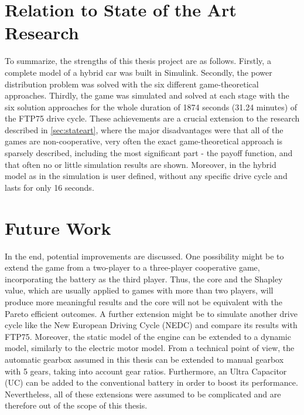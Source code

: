 \section{Relation to State of the Art Research}
To summarize, the strengths of this thesis project are as follows. Firstly, a complete model of a hybrid car was built in Simulink. Secondly, the power distribution problem was solved with the six different game-theoretical approaches. Thirdly, the game was simulated and solved at each stage with the six solution approaches for the whole duration of 1874 seconds (31.24 minutes) of the FTP75 drive cycle. These achievements are a crucial extension to the research described in \ref{sec:stateart}, where the major disadvantages were that all of the games are non-cooperative, very often the exact game-theoretical approach is sparsely described, including the most significant part - the payoff function, and that often no or little simulation results are shown. Moreover, in the hybrid model as in \citet{hevMatlab} the simulation is user defined, without any specific drive cycle and lasts for only 16 seconds.

\section{Future Work}
In the end, potential improvements are discussed. One possibility might be to extend the game from a two-player to a three-player cooperative game, incorporating the battery as the third player. Thus, the core and the Shapley value, which are usually applied to games with more than two players, will produce more meaningful results and the core will not be equivalent with the Pareto efficient outcomes. A further extension might be to simulate another drive cycle like the New European Driving Cycle (NEDC) and compare its results with FTP75. Moreover, the static model of the engine can be extended to a dynamic model, similarly to the electric motor model. From a technical point of view, the automatic gearbox assumed in this thesis can be extended to manual gearbox with 5 gears, taking into account gear ratios. Furthermore, an Ultra Capacitor (UC) can be added to the conventional battery in order to boost its performance. Nevertheless, all of these extensions were assumed to be complicated and are therefore out of the scope of this thesis.
